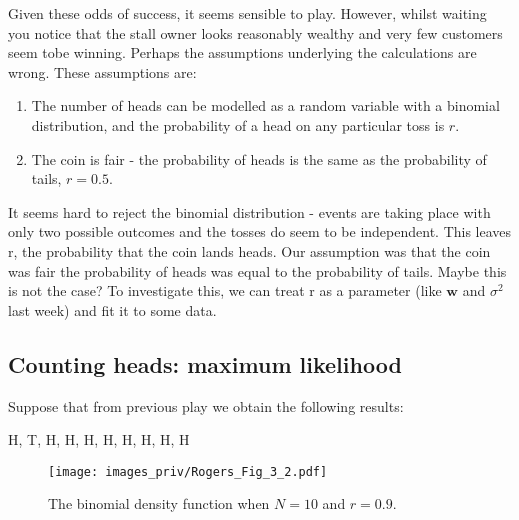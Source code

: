 Given these odds of success, it seems sensible to play.
However, whilst waiting you notice that the stall owner looks reasonably wealthy
and very few customers seem tobe winning. Perhaps the assumptions underlying
the calculations are wrong. These assumptions are:
\begin{enumerate}
\item The number of heads can be modelled as a random variable with a binomial
distribution, and the probability of a head on any particular toss is $r$.
\item The coin is fair - the probability of heads is the same as the probability of
tails, $r = 0.5$.
\end{enumerate}

It seems hard to reject the binomial distribution - events are taking place with only
two possible outcomes and the tosses do seem to be independent. This leaves r, the
probability that the coin lands heads. Our assumption was that the coin was fair
the probability of heads was equal to the probability of tails. Maybe this is not
the case? To investigate this, we can treat r as a parameter (like $\mathbf{w}$ and
$\sigma^2$ last week) and fit it to some data.

\subsection{Counting heads: maximum likelihood}

Suppose that from previous play we obtain the following results:
\begin{textcode}
H, T, H, H, H, H, H, H, H, H
\end{textcode}

\begin{figure}[h]
{\centering
\texttt{[image: images\_priv/Rogers\_Fig\_3\_2.pdf]}
\par}
\caption{The binomial density function when $N = 10$ and $r = 0.9$.}
\label{fig:Rogers_3_2}
\end{figure}

